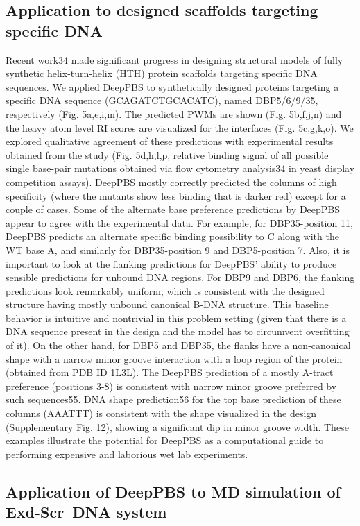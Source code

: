 \subsection{Application to designed scaffolds targeting specific DNA}
Recent work34 made significant progress in designing structural models of fully synthetic helix-turn-helix (HTH) protein scaffolds targeting specific DNA sequences. We applied DeepPBS to synthetically designed proteins targeting a specific DNA sequence (GCAGATCTGCACATC), named DBP5/6/9/35, respectively (Fig. 5a,e,i,m). The predicted PWMs are shown (Fig. 5b,f,j,n) and the heavy atom level RI scores are visualized for the interfaces (Fig. 5c,g,k,o). We explored qualitative agreement of these predictions with experimental results obtained from the study (Fig. 5d,h,l,p, relative binding signal of all possible single base-pair mutations obtained via flow cytometry analysis34 in yeast display competition assays). DeepPBS mostly correctly predicted the columns of high specificity (where the mutants show less binding that is darker red) except for a couple of cases. Some of the alternate base preference predictions by DeepPBS appear to agree with the experimental data. For example, for DBP35-position 11, DeepPBS predicts an alternate specific binding possibility to C along with the WT base A, and similarly for DBP35-position 9 and DBP5-position 7. Also, it is important to look at the flanking predictions for DeepPBS’ ability to produce sensible predictions for unbound DNA regions. For DBP9 and DBP6, the flanking predictions look remarkably uniform, which is consistent with the designed structure having mostly unbound canonical B-DNA structure. This baseline behavior is intuitive and nontrivial in this problem setting (given that there is a DNA sequence present in the design and the model has to circumvent overfitting of it). On the other hand, for DBP5 and DBP35, the flanks have a non-canonical shape with a narrow minor groove interaction with a loop region of the protein (obtained from PDB ID 1L3L). The DeepPBS prediction of a mostly A-tract preference (positions 3-8) is consistent with narrow minor groove preferred by such sequences55. DNA shape prediction56 for the top base prediction of these columns (AAATTT) is consistent with the shape visualized in the design (Supplementary Fig. 12), showing a significant dip in minor groove width. These examples illustrate the potential for DeepPBS as a computational guide to performing expensive and laborious wet lab experiments.

\subsection{Application of DeepPBS to MD simulation of Exd-Scr–DNA system}

